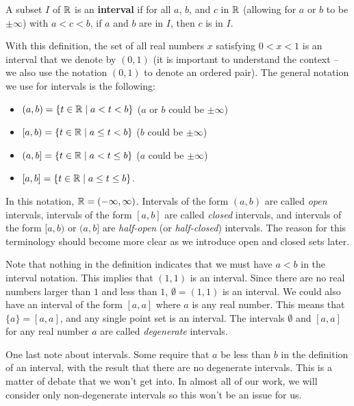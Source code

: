 \begin{definition} A subset $I$ of $\mathbb{R}$ is an \textbf{interval} if for all $a$, $b$, and $c$ in $\mathbb{R}$ (allowing for $a$ or $b$ to be $\pm \infty$) with $a < c < b$, if $a$ and $b$ are in $I$, then $c$ is in $I$. 
\end{definition}

With this definition, the set of all real numbers $x$ satisfying $0 < x < 1$ is an interval that we denote by $(0,1)$ (it is important to understand the context -- we also use the notation $(0,1)$ to denote an ordered pair). The general notation we use for intervals is the following: 
\begin{itemize}
\item $(a,b) = \{t \in \mathbb{R} \mid a < t < b\}$  ($a$ or $b$ could be $\pm \infty$)
\item $[a,b) = \{t \in \mathbb{R} \mid a \leq t < b\}$  ($b$ could be $\pm \infty$)
\item $(a,b] = \{t \in \mathbb{R} \mid a < t \leq b\}$  ($a$ could be $\pm \infty$)
\item $[a,b] = \{t \in \mathbb{R} \mid a \leq t \leq b\}$.
\end{itemize}

In this notation, $\mathbb{R} = (-\infty, \infty)$. Intervals of the form $(a,b)$ are called \emph{open} intervals, intervals of the form $[a,b]$ are called \emph{closed} intervals, and intervals of the form $[a,b)$ or $(a,b]$ are \emph{half-open} (or \emph{half-closed}) intervals. The reason for this terminology should become more clear as we introduce open and closed sets later. 

Note that nothing in the definition indicates that we must have $a < b$ in the interval notation. This implies that $(1,1)$ is an interval. Since there are no real numbers larger than $1$ and less than $1$,  $\emptyset = (1,1)$ is an interval. We could also have an interval of the form $[a,a]$ where $a$ is any real number. This means that $\{a\} = [a,a]$, and any single point set is an interval. The intervals $\emptyset$ and $[a,a]$ for any real number $a$ are called \emph{degenerate} intervals.  

One last note about intervals. Some require that $a$ be less than $b$ in the definition of an interval, with the result that there are no degenerate intervals. This is a matter of debate that we won't get into. In almost all of our work, we will consider only non-degenerate intervals so this won't be an issue for us. 


\label{sec_union_int_comp}

